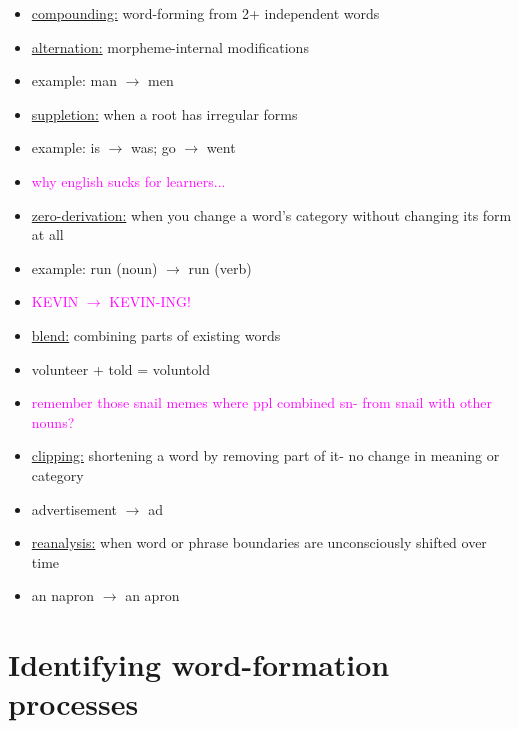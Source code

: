\documentclass[a4paper,11pt]{article}
\begin{document}
\begin{itemize}
\item \underline{compounding:} word-forming from 2+ independent words
\item \underline{alternation:} morpheme-internal modifications
\item[] \hspace{1cm} example: man $\rightarrow$ men
\item \underline{suppletion:} when a root has irregular forms 
\item[] \hspace{1cm} example: is $\rightarrow$ was; go $\rightarrow$ went
\item[] \hspace{1cm} \textcolor{magenta}{why english sucks for learners...}
\item \underline{zero-derivation:} when you change a word's category without changing its form at all
\item[] \hspace{1cm} example: run (noun) $\rightarrow$ run (verb)
\item[] \hspace{1cm} \textcolor{magenta}{KEVIN $\rightarrow$ KEVIN-ING!}
\item \underline{blend:} combining parts of existing words 
\item[] \hspace{1cm} volunteer + told = voluntold
\item[] \hspace{1cm} \textcolor{magenta}{remember those snail memes where ppl combined sn- from snail with other nouns?}
\item \underline{clipping:} shortening a word by removing part of it- no change in meaning or category
\item[] \hspace{1cm} advertisement $\rightarrow$ ad 
\item \underline{reanalysis:} when word or phrase boundaries are unconsciously shifted over time
\item[] \hspace{1cm} an napron $\rightarrow$ an apron
\end{itemize}


\section{Identifying word-formation processes}
\end{document}
